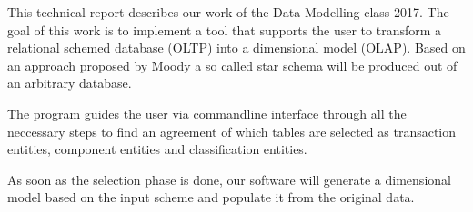 This technical report describes our work of the Data Modelling class 2017.
The goal of this work is to implement a tool that supports the user to transform a relational schemed database (OLTP) into a dimensional model (OLAP).
Based on an approach proposed by Moody %
a so called star schema will be produced out of an arbitrary database.

The program guides the user via commandline interface through all the neccessary steps to find an agreement of which tables are selected as transaction entities, component entities and classification entities.


As soon as the selection phase is done, our software will generate a dimensional model based on the input scheme and populate it from the original data.
